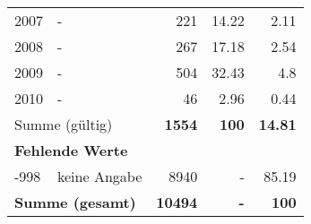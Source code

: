 \begin{longtable}{lXrrr}
     2007 &
     \multicolumn{1}{X}{ -  } &


       \num{221} &
       \num[round-mode=places,round-precision=2]{14.22} &
         \num[round-mode=places,round-precision=2]{2.11} \\

     2008 &
     \multicolumn{1}{X}{ -  } &


       \num{267} &
       \num[round-mode=places,round-precision=2]{17.18} &
         \num[round-mode=places,round-precision=2]{2.54} \\

     2009 &
     \multicolumn{1}{X}{ -  } &


       \num{504} &
       \num[round-mode=places,round-precision=2]{32.43} &
         \num[round-mode=places,round-precision=2]{4.8} \\

     2010 &
     \multicolumn{1}{X}{ -  } &


       \num{46} &
       \num[round-mode=places,round-precision=2]{2.96} &
         \num[round-mode=places,round-precision=2]{0.44} \\
     \midrule
     \multicolumn{2}{l}{Summe (gültig)} &
       \textbf{\num{1554}} &
     \textbf{\num{100}} &
       \textbf{\num[round-mode=places,round-precision=2]{14.81}} \\
     \multicolumn{5}{l}{\textbf{Fehlende Werte}}\\
       -998 &
       keine Angabe &
         \num{8940} &
        - &
         \num[round-mode=places,round-precision=2]{85.19} \\
     \midrule
     \multicolumn{2}{l}{\textbf{Summe (gesamt)}} &
          \textbf{\num{10494}} &
        \textbf{-} &
        \textbf{\num{100}} \\
     \bottomrule
     \end{longtable}
     

